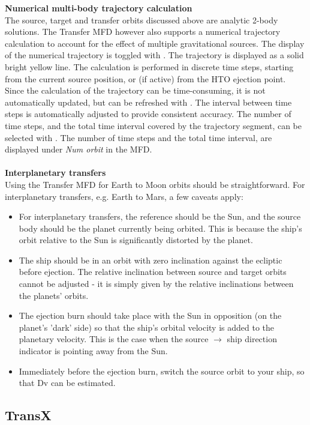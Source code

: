 \documentclass[Orbiter User Manual.tex]{subfiles}
\begin{document}
\textbf{Numerical multi-body trajectory calculation}\\
The source, target and transfer orbits discussed above are analytic 2-body solutions. The Transfer MFD however also supports a numerical trajectory calculation to account for the effect of multiple gravitational sources. The display of the numerical trajectory is toggled with \Shift{}. The trajectory is displayed as a solid bright yellow line. The calculation is performed in discrete time steps, starting from the current source position, or (if active) from the HTO ejection point. Since the calculation of the trajectory can be time-consuming, it is not automatically updated, but can be refreshed with \Shift{}. The interval between time steps is automatically adjusted to provide consistent accuracy. The number of time steps, and the total time interval covered by the trajectory segment, can be selected with \Shift{}. The number of time steps and the total time interval, are displayed under \textit{Num orbit} in the MFD.\\
\\
\textbf{Interplanetary transfers}\\
Using the Transfer MFD for Earth to Moon orbits should be straightforward. For interplanetary transfers, e.g. Earth to Mars, a few caveats apply:
\begin{itemize}
\item For interplanetary transfers, the reference should be the Sun, and the source body should be the planet currently being orbited. This is because the ship's orbit relative to the Sun is significantly distorted by the planet.
\item The ship should be in an orbit with zero inclination against the ecliptic before ejection. The relative inclination between source and target orbits cannot be adjusted - it is simply given by the relative inclinations between the planets' orbits.
\item The ejection burn should take place with the Sun in opposition (on the planet's 'dark' side) so that the ship's orbital velocity is added to the planetary velocity. This is the case when the source $\rightarrow$ ship direction indicator is pointing away from the Sun.
\item Immediately before the ejection burn, switch the source orbit to your ship, so that Dv can be estimated.
\end{itemize}



\subsection{TransX}
\label{ssec:mfd_transx}
\end{document}
